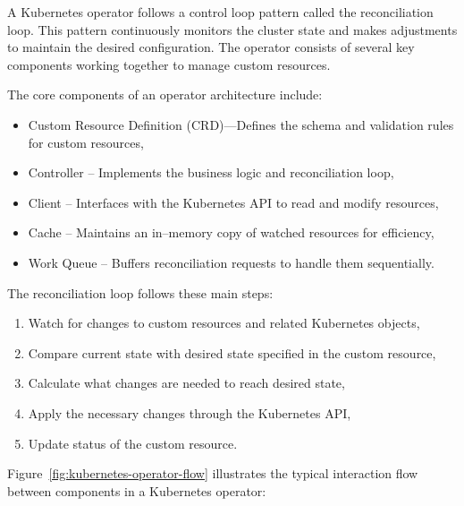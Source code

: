 A Kubernetes operator follows a control loop pattern called the reconciliation loop.
This pattern continuously monitors the cluster state and makes adjustments to maintain the desired configuration.
The operator consists of several key components working together to manage custom resources.

The core components of an operator architecture include:

\begin{itemize}
    \item Custom Resource Definition (CRD)—Defines the schema and validation rules for custom resources,
    \item Controller -- Implements the business logic and reconciliation loop,
    \item Client -- Interfaces with the Kubernetes API to read and modify resources,
    \item Cache -- Maintains an in--memory copy of watched resources for efficiency,
    \item Work Queue -- Buffers reconciliation requests to handle them sequentially.
\end{itemize}

The reconciliation loop follows these main steps:
\begin{enumerate}
    \item Watch for changes to custom resources and related Kubernetes objects,
    \item Compare current state with desired state specified in the custom resource,
    \item Calculate what changes are needed to reach desired state,
    \item Apply the necessary changes through the Kubernetes API,
    \item Update status of the custom resource.
\end{enumerate}

Figure~\ref{fig:kubernetes-operator-flow} illustrates the typical interaction flow between components in a Kubernetes operator:

